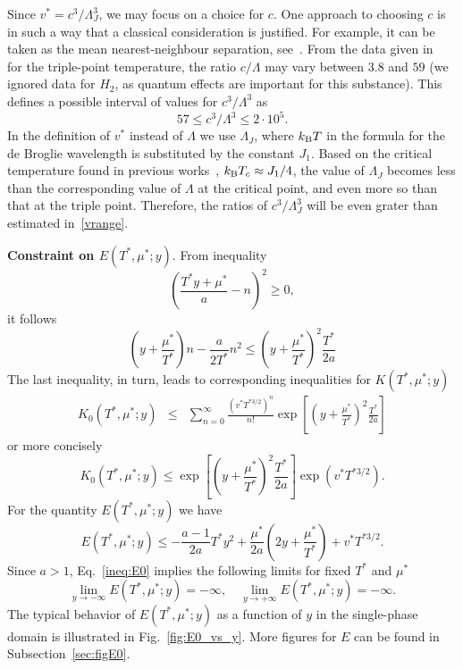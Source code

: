 \documentclass[12pt]{article}
\numberwithin{equation}{section}
\begin{document}
	Since $v^* = c^3/\Lambda_J^3$, we may focus on a choice for $c$. One approach to choosing $c$ is in such a way that a classical consideration is justified. For example, it can be taken as the mean nearest-neighbour separation, see~\cite[Sec.~1.1]{HansenMcDonald13}. From the data given in~\cite[Table~1.1]{HansenMcDonald13} for the triple-point temperature, the ratio $c/\Lambda$ may vary between $3.8$ and $59$ (we ignored data for $H_2$, as quantum effects are important for this substance). This defines a possible interval of values for $c^3/\Lambda^3$ as
	\begin{equation}
		\label{vrange}
		57 \leq c^3/\Lambda^3 \leq 2 \cdot 10^5.
	\end{equation}
	In the definition of $v^*$ instead of $\Lambda$ we use $\Lambda_J$, where $k_{\rm B} T$ in the formula for the de Broglie wavelength is substituted by the constant $J_1$. Based on the critical temperature found in previous works~\cite{KKD18, KKD20, KD22}, $k_{\rm B}T_c \approx J_1/4$, the value of $\Lambda_J$ becomes less than the corresponding value of $\Lambda$ at the critical point, and even more so than that at the triple point. Therefore, the ratios of $c^3/\Lambda_J^3$ will be even grater than estimated in~\eqref{vrange}. 
	
	\textbf{Constraint on $E(T^*,\mu^*;y)$}. From inequality
	\begin{equation}
		\left(\frac{T^* y + \mu^*}{a} - n \right)^2 \geq 0,
	\end{equation}
	it follows
	\begin{equation}
		\left(y + \frac{\mu^*}{T^*}\right)n - \frac{a}{2T^*}n^2 \leq \left(y + \frac{\mu^*}{T^*}\right)^2 \frac{T^*}{2a}
	\end{equation}
	The last inequality, in turn, leads to corresponding inequalities for $K(T^*,\mu^*;y)$
	\begin{eqnarray}
		K_0(T^*,\mu^*;y) & \leq & \sum_{n=0}^{\infty}\frac{(v^* T^{*3/2})^n}{n!} \exp[\left(y+\frac{\mu^*}{T^*}\right)^2 \frac{T^*}{2a}]
	\end{eqnarray}
	or more concisely
	\begin{equation}
		K_0(T^*,\mu^*;y) \leq \exp[\left(y+\frac{\mu^*}{T^*}\right)^2 \frac{T^*}{2a}] \exp(v^* T^{*3/2}).
	\end{equation}
	For the quantity $E(T^*,\mu^*;y)$ we have
	\begin{equation}
		\label{ineq:E0}
		E(T^*,\mu^*;y) \leq -\frac{a-1}{2a} T^* y^2 + \frac{\mu^*}{2a}\left(2y + \frac{\mu^*}{T^*}\right) + v^* T^{*3/2}.
	\end{equation}
	Since $a>1$, Eq.~\eqref{ineq:E0} implies the following limits for fixed $T^*$ and $\mu^*$
	\begin{equation}
		\lim_{y \to -\infty} E(T^*,\mu^*;y) = -\infty, \quad \lim\limits_{y \to +\infty} E(T^*,\mu^*;y) = -\infty.
	\end{equation}
	The typical behavior of $E(T^*,\mu^*;y)$ as a function of $y$ in the single-phase domain is illustrated in Fig.~\ref{fig:E0_vs_y}. More figures for $E$ can be found in Subsection~\ref{sec:figE0}.
	
\end{document}
